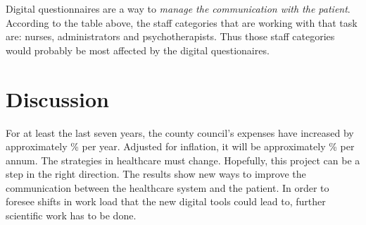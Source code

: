 \documentclass[12pt,a4paper,oneside]{article}
\let\oldcite\cite
\renewcommand*\cite[1]{\textsuperscript{\oldcite{#1}}}
\begin{document}
\newpage
Digital questionnaires are a way to {\it manage the communication with the patient}. According to the table above, the staff categories that are working with that task are: nurses, administrators and psychotherapists. Thus those staff categories would probably be most affected by the digital questionaires.



\section*{Discussion}
For at least the last seven years, the county council's expenses have increased by approximately {}\% per year. Adjusted for inflation, it will be approximately {}\% per annum\cite{numbers3.1, numbers3.2}. The strategies in healthcare must change. Hopefully, this project can be a step in the right direction. The results show new ways to improve the communication between the healthcare system and the patient. 
In order to foresee shifts in work load that the new digital tools could lead to, further scientific work has to be done. %
\end{document}
